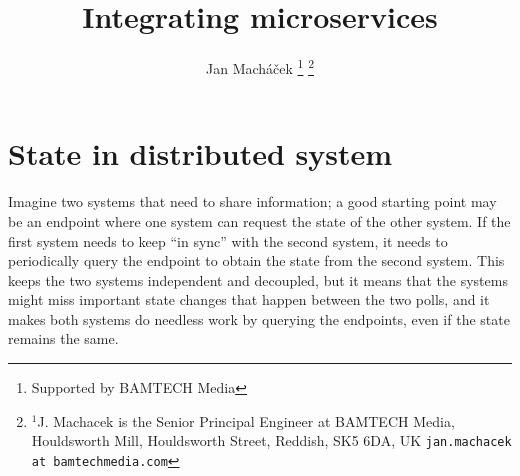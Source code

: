 



\title{Integrating microservices}

\author{Jan Mach{\'a}\v{c}ek%
\thanks{Supported by BAMTECH Media}%
\thanks{$^{1}$J. Machacek is the Senior Principal Engineer at BAMTECH Media, Houldsworth Mill, Houldsworth Street, Reddish, SK5 6DA, UK {\tt\small jan.machacek at bamtechmedia.com}}%
}




\section{State in distributed system}
Imagine two systems that need to share information; a good starting point may be an endpoint where one system can request the state of the other system. If the first system needs to keep ``in sync'' with the second system, it needs to periodically query the endpoint to obtain the state from the second system. This keeps the two systems independent and decoupled, but it means that the systems might miss important state changes that happen between the two polls, and it makes both systems do needless work by querying the endpoints, even if the state remains the same.

